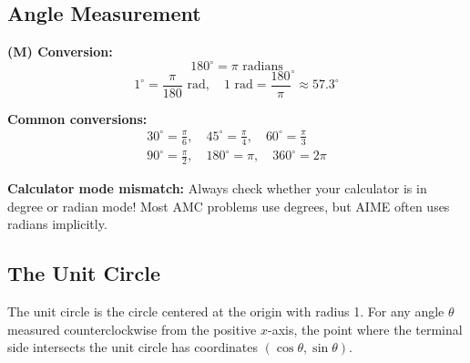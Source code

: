 \documentclass[12pt]{extarticle}
\begin{document}
\subsection{Angle Measurement}

\begin{conceptbox}
\textbf{(M) Conversion:}
\[
180^\circ = \pi \text{ radians}
\]
\[
1^\circ = \frac{\pi}{180} \text{ rad}, \quad 1 \text{ rad} = \frac{180}{\pi}^\circ \approx 57.3^\circ
\]

\textbf{Common conversions:}
\begin{align*}
30^\circ = \frac{\pi}{6}, \quad 45^\circ = \frac{\pi}{4}, \quad 60^\circ = \frac{\pi}{3} \\
90^\circ = \frac{\pi}{2}, \quad 180^\circ = \pi, \quad 360^\circ = 2\pi
\end{align*}
\end{conceptbox}

\begin{warningbox}
\textbf{Calculator mode mismatch:} Always check whether your calculator is in degree or radian mode! Most AMC problems use degrees, but AIME often uses radians implicitly.
\end{warningbox}

\subsection{The Unit Circle}

The unit circle is the circle centered at the origin with radius 1. For any angle $\theta$ measured counterclockwise from the positive $x$-axis, the point where the terminal side intersects the unit circle has coordinates $(\cos\theta, \sin\theta)$.

\begin{center}
\end{center}
\end{document}

